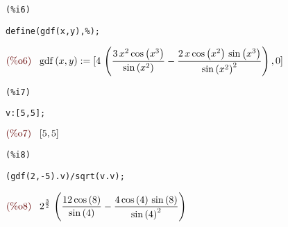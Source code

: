 \documentclass[12pt]{article}
\begin{document}
\noindent
\begin{minipage}[t]{8ex}{\color{red}\bf
\begin{verbatim}
(%i6) 
\end{verbatim}}
\end{minipage}
\begin{minipage}[t]{\textwidth}{\color{blue}
\begin{verbatim}
define(gdf(x,y),%);
\end{verbatim}}
\end{minipage}
\begin{math}\displaystyle
\parbox{8ex}{\color{labelcolor}(\%o6) }
\mathrm{gdf}\left( x,y\right) :=[4\,\left( \frac{3\,{x}^{2}\,\mathrm{cos}\left( {x}^{3}\right) }{\mathrm{sin}\left( {x}^{2}\right) }-\frac{2\,x\,\mathrm{cos}\left( {x}^{2}\right) \,\mathrm{sin}\left( {x}^{3}\right) }{{\mathrm{sin}\left( {x}^{2}\right) }^{2}}\right) ,0]
\end{math}


\noindent
\begin{minipage}[t]{8ex}{\color{red}\bf
\begin{verbatim}
(%i7) 
\end{verbatim}}
\end{minipage}
\begin{minipage}[t]{\textwidth}{\color{blue}
\begin{verbatim}
v:[5,5];
\end{verbatim}}
\end{minipage}
\begin{math}\displaystyle
\parbox{8ex}{\color{labelcolor}(\%o7) }
[5,5]
\end{math}


\noindent
\begin{minipage}[t]{8ex}{\color{red}\bf
\begin{verbatim}
(%i8) 
\end{verbatim}}
\end{minipage}
\begin{minipage}[t]{\textwidth}{\color{blue}
\begin{verbatim}
(gdf(2,-5).v)/sqrt(v.v);
\end{verbatim}}
\end{minipage}
\begin{math}\displaystyle
\parbox{8ex}{\color{labelcolor}(\%o8) }
{2}^{\frac{3}{2}}\,\left( \frac{12\,\mathrm{cos}\left( 8\right) }{\mathrm{sin}\left( 4\right) }-\frac{4\,\mathrm{cos}\left( 4\right) \,\mathrm{sin}\left( 8\right) }{{\mathrm{sin}\left( 4\right) }^{2}}\right) 
\end{math}
\end{document}
